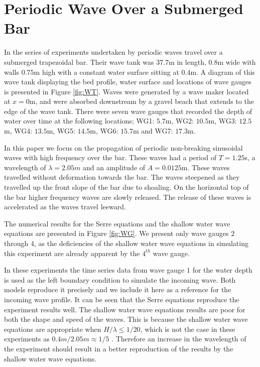 \documentclass[a4paper,fleqn]{article} %
\begin{document}
\section{Periodic Wave Over a Submerged Bar}
\label{Oscillatory Wave Over a Submerged Bar}
In the series of experiments undertaken by \cite{Beji-Battjes-1994} periodic waves travel over a submerged trapezoidal bar. Their wave tank was $37.7$m in length, $0.8$m wide with walls $0.75$m high with a constant water surface sitting at $0.4$m. A diagram of this wave tank displaying the bed profile, water surface and locations of wave gauges is presented in Figure \ref{fig:WT}. Waves were generated by a wave maker located at $x=0$m, and were absorbed downstream by a gravel beach that extends to the edge of the wave tank. There were seven wave gauges that recorded the depth of water over time at the following locations; WG1: $5.7$m, WG2: $10.5$m, WG3: $12.5$m, WG4: $13.5$m, WG5: $14.5$m, WG6: $15.7$m and WG7: $17.3$m.

In this paper we focus on the propagation of periodic non-breaking sinusoidal waves with high frequency over the bar. These waves had a period of $T = 1.25$s, a wavelength of $\lambda = 2.05m$ and an amplitude of $A = 0.0125$m. These waves travelled without deformation towards the bar. The waves steepened as they travelled up the front slope of the bar due to shoaling. On the horizontal top of the bar higher frequency waves are slowly released. The release of these waves is accelerated as the waves travel leeward. 

The numerical results for the Serre equations and the shallow water wave equations are presented in Figure \ref{fig:WG}. We present only wave gauges $2$ through $4$, as the deficiencies of the shallow water wave equations in simulating this experiment are already apparent by the $4^{th}$ wave gauge.

In these experiments the time series data from wave gauge $1$ for the water depth is used as the left boundary condition to simulate the incoming wave. Both models reproduce it precisely and we include it here as a reference for the incoming wave profile. It can be seen that the Serre equations reproduce the experiment results well. The shallow water wave equations results are poor for both the shape and speed of the waves. This is because the shallow water wave equations are appropriate when $H / \lambda \le 1 / 20$, which is not the case in these experiments as $0.4m / 2.05m \approx 1 / 5$ . Therefore an increase in the wavelength of the experiment should result in a better reproduction of the results by the shallow water wave equations. 
\end{document}
